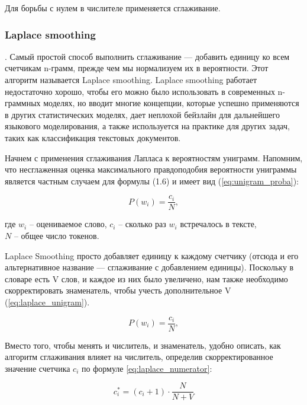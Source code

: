 Для борьбы с нулем в числителе применяется сглаживание. 

\subsubsection{Laplace smoothing}. Самый простой способ выполнить сглаживание --- добавить единицу ко всем счетчикам n-грамм, прежде чем
мы нормализуем их в вероятности. Этот алгоритм называется
Laplace smoothing. Laplace smoothing работает недостаточно хорошо, чтобы его можно было использовать в современных n-граммных моделях, но вводит многие концепции, которые успешно применяются в других статистических моделях, дает неплохой бейзлайн для дальнейшего языкового моделирования, а также используется на практике для других задач, таких как классификация текстовых документов.

Начнем с применения сглаживания Лапласа к вероятностям униграмм.
Напомним, что несглаженная оценка максимального правдоподобия вероятности униграммы является частным случаем для формулы (1.6) и имеет вид (\ref{eq:unigram_proba}):

\begin{equation}
	\label{eq:unigram_proba}
	P(w_i) = \frac{c_i}{N},
\end{equation}
\begin{explanation}
	где $w_i$ -- оцениваемое слово, $c_i$ -- сколько раз $w_i$ встречалось в тексте, \\$N$ -- общее число токенов.
\end{explanation}

Laplace Smoothing просто добавляет единицу к каждому счетчику (отсюда и его альтернативное название — сглаживание с добавлением единицы). Поскольку в словаре есть V слов, и каждое из них было увеличено, нам также необходимо скорректировать знаменатель, чтобы учесть дополнительное V (\ref{eq:laplace_unigram}).

\begin{equation}
	\label{eq:laplace_unigram}
	P(w_i) = \frac{c_i}{N},
\end{equation}

Вместо того, чтобы менять и числитель, и знаменатель, удобно
описать, как алгоритм сглаживания влияет на числитель, определив скорректированное значение счетчика $c_i$ по формуле \ref{eq:laplace_numerator}:

\begin{equation}
	\label{eq:laplace_numerator}
	c_i^* = (c_i + 1) \cdot \frac{N}{N + V}
\end{equation}

